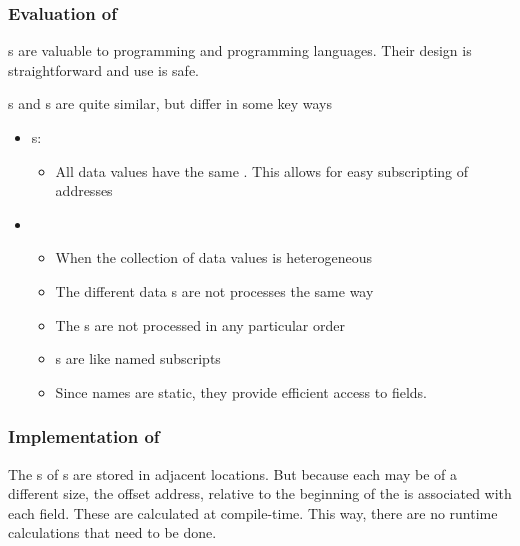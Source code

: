 \subsubsection{Evaluation of }\label{subsubsec:Evaluation_of_Record_Types}
s are valuable to programming and programming languages.
Their design is straightforward and use is safe.

s and s are quite similar, but differ in some key ways
\begin{itemize}[noitemsep]
\item {}s:
  \begin{itemize}[noitemsep]
  \item All data values have the same . This allows for easy subscripting of  addresses
  \end{itemize}
\item {}
  \begin{itemize}[noitemsep]
  \item When the collection of data values is heterogeneous
  \item The different data s are not processes the same way
  \item The s are not processed in any particular order
  \item {}s are like named subscripts
  \item Since  names are static, they provide efficient access to fields.
  \end{itemize}
\end{itemize}

\subsubsection{Implementation of }\label{subsubsec:Implementation_of_Record_Types}
The s of s are stored in adjacent  locations.
But because each  may be of a different size, the offset address, relative to the beginning of the  is associated with each field.
These are calculated at compile-time.
This way, there are no runtime calculations that need to be done.

